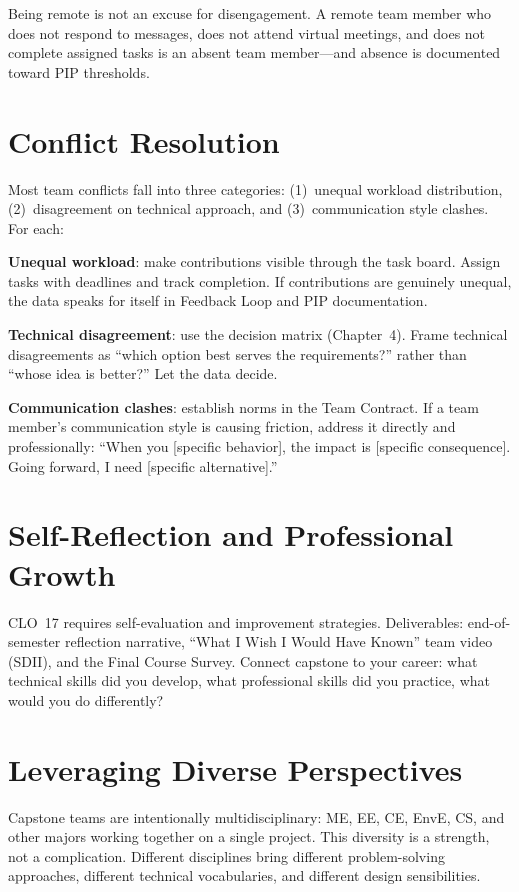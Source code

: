 Being remote is not an excuse for disengagement. A remote team member who does not respond to messages, does not attend virtual meetings, and does not complete assigned tasks is an absent team member---and absence is documented toward PIP thresholds.

\section{Conflict Resolution}
Most team conflicts fall into three categories: (1)~unequal workload distribution, (2)~disagreement on technical approach, and (3)~communication style clashes. For each:

\textbf{Unequal workload}: make contributions visible through the task board. Assign tasks with deadlines and track completion. If contributions are genuinely unequal, the data speaks for itself in Feedback Loop and PIP documentation.

\textbf{Technical disagreement}: use the decision matrix (Chapter~4). Frame technical disagreements as ``which option best serves the requirements?'' rather than ``whose idea is better?'' Let the data decide.

\textbf{Communication clashes}: establish norms in the Team Contract. If a team member's communication style is causing friction, address it directly and professionally: ``When you [specific behavior], the impact is [specific consequence]. Going forward, I need [specific alternative].''

\section{Self-Reflection and Professional Growth}
CLO~17 requires self-evaluation and improvement strategies. Deliverables: end-of-semester reflection narrative, ``What I Wish I Would Have Known'' team video (SDII), and the Final Course Survey. Connect capstone to your career: what technical skills did you develop, what professional skills did you practice, what would you do differently?


\section{Leveraging Diverse Perspectives}
Capstone teams are intentionally multidisciplinary: ME, EE, CE, EnvE, CS, and other majors working together on a single project. This diversity is a strength, not a complication. Different disciplines bring different problem-solving approaches, different technical vocabularies, and different design sensibilities.

